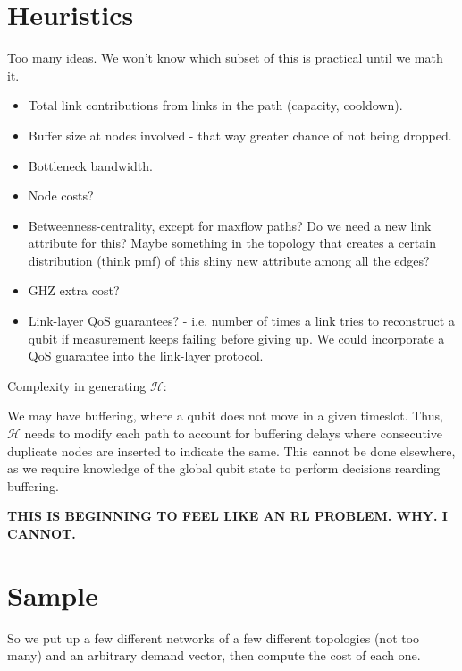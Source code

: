 \documentclass{amsart}
\begin{document}
    \label{TODO:algorithm}

    \section{Heuristics}

    Too many ideas. We won't know which subset of this is practical until we math it.
    \begin{itemize}
        \item Total link contributions from links in the path (capacity, cooldown).
        \item Buffer size at nodes involved - that way greater chance of not being dropped.
        \item Bottleneck bandwidth.
        \item Node costs? 
        \item Betweenness-centrality, except for maxflow paths? Do we need a new link attribute for this? Maybe something in the topology that creates a certain distribution (think pmf) of this shiny new attribute among all the edges?
        \item GHZ extra cost?
        \item Link-layer QoS guarantees? - i.e. number of times a link tries to reconstruct a qubit if measurement keeps failing before giving up. We could incorporate a QoS guarantee into the link-layer protocol.
    \end{itemize}

    Complexity in generating \(\mathcal{H}\): 

    We may have buffering, where a qubit does not move in a given timeslot. Thus, \(\mathcal{H}\) needs to modify each path to account for buffering delays where consecutive duplicate nodes are inserted to indicate the same. This cannot be done elsewhere, as we require knowledge of the global qubit state to perform decisions rearding buffering.

    \textbf{THIS IS BEGINNING TO FEEL LIKE AN RL PROBLEM. WHY. I CANNOT.}

    \section{Sample}

    So we put up a few different networks of a few different topologies (not too many) and an arbitrary demand vector, then compute the cost of each one. 
\end{document}
